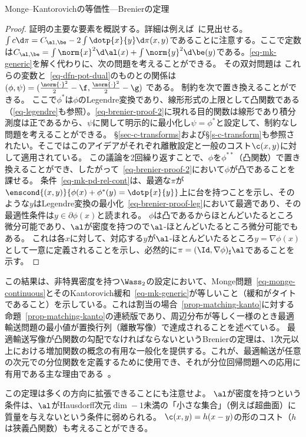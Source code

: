 \begin{rem2}{Monge--Kantorovichの等価性---Brenierの定理}
\begin{proof}
	証明の主要な要素を概説する。詳細は例えば~\citep{SantambrogioBook}に見出せる。
	$\int c \d\pi = C_{\al,\be} - 2 \int \dotp{x}{y}\d\pi(x,y)$であることに注意する。ここで定数は$C_{\al,\be} = \int \norm{x}^2\d\al(x) + \int \norm{y}^2\d\be(y)$である。\eqref{eq-mk-generic}を解く代わりに、次の問題を考えることができる。
	その双対問題は
	これらの変数と~\eqref{eq-dfn-pot-dual}のものとの関係は
	$(\phi,\psi) = (\frac{\norm{\cdot}^2}{2}-\f,\frac{\norm{\cdot}^2}{2}-\g)$
	である。
	制約を次で置き換えることができる。
	ここで$\phi^*$は$\phi$のLegendre変換であり、線形形式の上限として凸関数である（\eqref{eq-legendre}も参照）。\eqref{eq-brenier-proof-2}に現れる目的関数は線形であり積分測度は正であるから、$\psi$に関して明示的に最小化し$\psi=\phi^*$と設定して、制約なし問題を考えることができる。
	\eql{\label{eq-brenier-proof-2}
		\umin{\phi} \int_\X \phi \d\al + \int_\Y \phi^* \d\be;
	}
	\S\ref{sec-c-transforms}および\S\ref{s-c-transform}も参照されたい。そこではこのアイデアがそれぞれ離散設定と一般のコスト$\c(x,y)$に対して適用されている。
	この議論を2回繰り返すことで、$\phi$を$\phi^{**}$（凸関数）で置き換えることができ、したがって~\eqref{eq-brenier-proof-2}において$\phi$が凸であることを課せる。
	条件~\eqref{eq-mk-pd-rel-cont}は、最適な$\pi$が$\enscond{(x,y)}{\phi(x)+\phi^*(y)=\dotp{x}{y}}$上に台を持つことを示し、そのような$y$はLegendre変換の最小化~\eqref{eq-brenier-proof-leg}において最適であり、その最適性条件は$y \in \partial \phi(x)$と読まれる。
	$\phi$は凸であるからほとんどいたるところ微分可能であり、$\al$が密度を持つので$\al$-ほとんどいたるところ微分可能でもある。
	これは各$x$に対して、対応する$y$が$\al$-ほとんどいたるところ$y = \nabla\phi(x)$として一意に定義されることを示し、必然的に$\pi = (\Id,\nabla\phi)_\sharp \al$であることを示す。
\end{proof}

この結果は、非特異密度を持つ$\Wass_2$の設定において、Monge問題~\eqref{eq-monge-continuous}とそのKantorovich緩和~\eqref{eq-mk-generic}が等しいこと（緩和がタイトであること）を示している。これは割当の場合~\eqref{prop-matching-kanto}に対する命題~\ref{prop-matching-kanto}の連続版であり、周辺分布が等しく一様のとき最適輸送問題の最小値が置換行列（離散写像）で達成されることを述べている。
%
最適輸送写像が凸関数の勾配でなければならないというBrenierの定理は、1次元以上における増加関数の概念の有用な一般化を提供する。これが、最適輸送が任意の次元での分位関数を定義するために使用でき、それが分位回帰問題への応用に有用である主な理由である~\citep{carlier2016vector}。

この定理は多くの方向に拡張できることにも注意せよ。
%
$\al$が密度を持つという条件は、$\al$がHausdorff次元$\dim-1$未満の「小さな集合」（例えば超曲面）に質量を与えないという条件に弱められる。
%
$\c(x,y)=h(x-y)$の形のコスト（$h$は狭義凸関数）も考えることができる。
\end{rem2}
